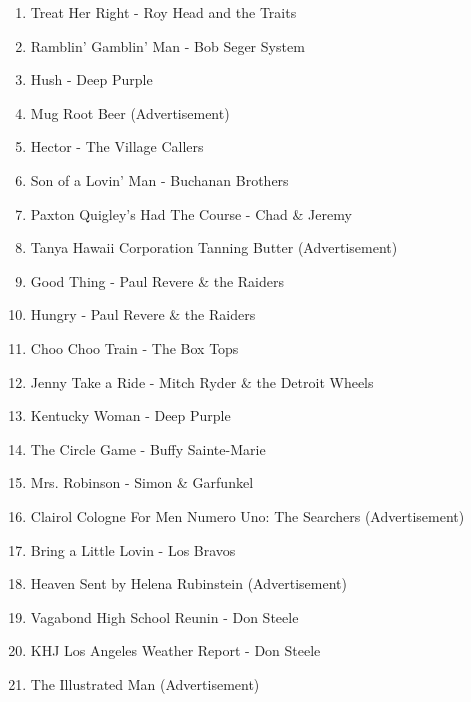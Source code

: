 \documentclass[12pt]{article} %
\begin{document}
                                \small
                                \begin{enumerate}
                                    \item Treat Her Right - Roy Head and the Traits
                                    \item Ramblin' Gamblin' Man - Bob Seger System
                                    \item Hush - Deep Purple
                                    \item Mug Root Beer (Advertisement)
                                    \item Hector - The Village Callers
                                    \item Son of a Lovin' Man - Buchanan Brothers
                                    \item Paxton Quigley's Had The Course - Chad \& Jeremy
                                    \item Tanya Hawaii Corporation Tanning Butter (Advertisement)
                                    \item Good Thing - Paul Revere \& the Raiders
                                    \item Hungry - Paul Revere \& the Raiders
                                    \item Choo Choo Train - The Box Tops
                                    \item Jenny Take a Ride - Mitch Ryder \& the Detroit Wheels
                                    \item Kentucky Woman - Deep Purple
                                    \item The Circle Game - Buffy Sainte-Marie 
                                    \item Mrs. Robinson - Simon \& Garfunkel
                                    \item Clairol Cologne For Men Numero Uno: The Searchers (Advertisement)
                                    \item Bring a Little Lovin - Los Bravos
                                    \item Heaven Sent by Helena Rubinstein (Advertisement)
                                    \item Vagabond High School Reunin - Don Steele
                                    \item KHJ Los Angeles Weather Report - Don Steele
                                    \item The Illustrated Man (Advertisement)

\end{enumerate}
\end{document}
